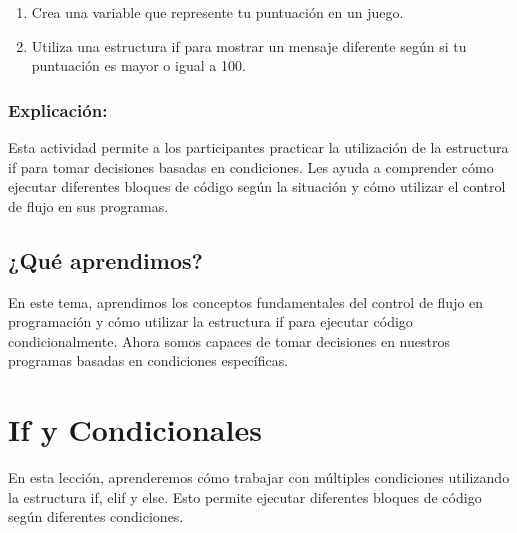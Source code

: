 \documentclass[
  a4paper,
  DIV=11,
  numbers=noendperiod,
  onepage,
  openany]{scrreprt}
\providecommand{\tightlist}{%
  \setlength{\itemsep}{0pt}\setlength{\parskip}{0pt}}\usepackage{longtable,booktabs,array}
\begin{document}
\begin{tcolorbox}[enhanced jigsaw, leftrule=.75mm, bottomtitle=1mm, title=\textcolor{quarto-callout-tip-color}{\faLightbulb}\hspace{0.5em}{Actividad Práctica}, colbacktitle=quarto-callout-tip-color!10!white, coltitle=black, bottomrule=.15mm, colframe=quarto-callout-tip-color-frame, titlerule=0mm, opacityback=0, rightrule=.15mm, toptitle=1mm, opacitybacktitle=0.6, arc=.35mm, breakable, colback=white, toprule=.15mm, left=2mm]

\begin{enumerate}
\def\labelenumi{\arabic{enumi}.}
\tightlist
\item
  Crea una variable que represente tu puntuación en un juego.
\item
  Utiliza una estructura if para mostrar un mensaje diferente según si
  tu puntuación es mayor o igual a 100.
\end{enumerate}

\end{tcolorbox}

\subsection{Explicación:}\label{explicaciuxf3n-17}

Esta actividad permite a los participantes practicar la utilización de
la estructura if para tomar decisiones basadas en condiciones. Les ayuda
a comprender cómo ejecutar diferentes bloques de código según la
situación y cómo utilizar el control de flujo en sus programas.

\section{¿Qué aprendimos?}\label{quuxe9-aprendimos-3}

En este tema, aprendimos los conceptos fundamentales del control de
flujo en programación y cómo utilizar la estructura if para ejecutar
código condicionalmente. Ahora somos capaces de tomar decisiones en
nuestros programas basadas en condiciones específicas.

\chapter{If y Condicionales}\label{if-y-condicionales}

En esta lección, aprenderemos cómo trabajar con múltiples condiciones
utilizando la estructura if, elif y else. Esto permite ejecutar
diferentes bloques de código según diferentes condiciones.
\end{document}
